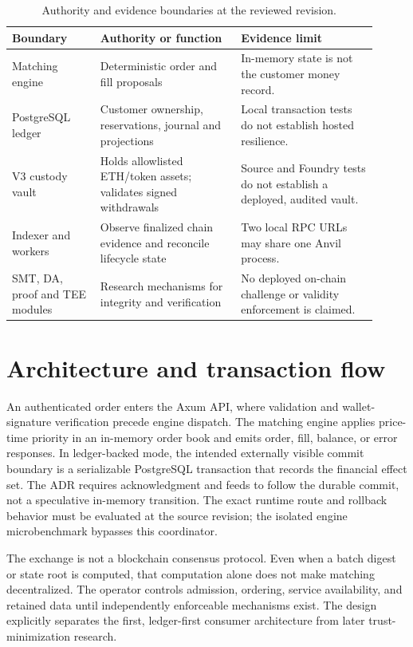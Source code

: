 \documentclass[envcountsame,runningheads,notitlepage]{llncs}
\begin{document}
\begin{table}[h]
\centering\small
\begin{tabular}{p{0.22\linewidth}p{0.35\linewidth}p{0.34\linewidth}}
\toprule
Boundary & Authority or function & Evidence limit \\
\midrule
Matching engine & Deterministic order and fill proposals & In-memory state is not the customer money record. \\
PostgreSQL ledger & Customer ownership, reservations, journal and projections & Local transaction tests do not establish hosted resilience. \\
V3 custody vault & Holds allowlisted ETH/token assets; validates signed withdrawals & Source and Foundry tests do not establish a deployed, audited vault. \\
Indexer and workers & Observe finalized chain evidence and reconcile lifecycle state & Two local RPC URLs may share one Anvil process. \\
SMT, DA, proof and TEE modules & Research mechanisms for integrity and verification & No deployed on-chain challenge or validity enforcement is claimed. \\
\bottomrule
\end{tabular}
\caption{Authority and evidence boundaries at the reviewed revision.}
\end{table}

\section{Architecture and transaction flow}
An authenticated order enters the Axum API, where validation and wallet-signature verification precede engine dispatch. The matching engine applies price-time priority in an in-memory order book and emits order, fill, balance, or error responses. In ledger-backed mode, the intended externally visible commit boundary is a serializable PostgreSQL transaction that records the financial effect set. The ADR requires acknowledgment and feeds to follow the durable commit, not a speculative in-memory transition.\cite{adrs} The exact runtime route and rollback behavior must be evaluated at the source revision; the isolated engine microbenchmark bypasses this coordinator.

The exchange is not a blockchain consensus protocol. Even when a batch digest or state root is computed, that computation alone does not make matching decentralized. The operator controls admission, ordering, service availability, and retained data until independently enforceable mechanisms exist. The design explicitly separates the first, ledger-first consumer architecture from later trust-minimization research.\cite{plan}
\end{document}
